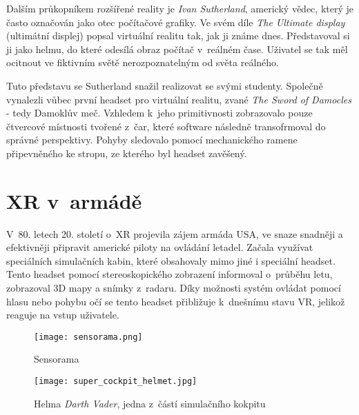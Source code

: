 Dalším průkopníkem rozšířené reality je \textit{Ivan Sutherland}, americký vědec, který je často označován jako otec počítačové grafiky. Ve svém díle \textit{The Ultimate display} (ultimátní displej) popsal virtuální realitu tak, jak ji známe dnes. Představoval si ji jako helmu, do které odesílá obraz počítač v~reálném čase. Uživatel se tak měl ocitnout ve fiktivním světě nerozpoznatelným od světa reálného. \cite{otechnice} \cite{ivan_sutherland_bio}

Tuto představu se Sutherland snažil realizovat se svými studenty. Společně vynalezli vůbec první headset pro virtuální realitu, zvané \textit{The Sword of Damocles} - tedy Damoklův meč. Vzhledem k~jeho primitivnosti zobrazovalo pouze čtvercové místnosti tvořené z~čar, které software následně transofrmoval do správné perspektivy. Pohyby sledovalo pomocí mechanického ramene připevněného ke stropu, ze kterého byl headset zavěšený. \cite{otechnice} \cite{Rheingold_1992}

\section{XR v~armádě}

V~80. letech 20. století o~XR projevila zájem armáda USA, ve snaze snadněji a efektivněji připravit americké piloty na ovládání letadel. Začala využívat speciálních simulačních kabin, které obsahovaly mimo jiné i speciální headset. Tento headset pomocí stereoskopického zobrazení informoval o~průběhu letu, zobrazoval 3D mapy a snímky z~radaru. Díky možnosti systém ovládat pomocí hlasu nebo pohybu očí se tento headset přibližuje k~dnešnímu stavu VR, jelikož reaguje na vstup uživatele. \cite{otechnice}


\begin{figure}[H]
    \centering

    \begin{minipage}{.5\textwidth}
        \centering
        \texttt{[image: sensorama.png]}
        \caption{Sensorama \cite{sensorama_patent}}
        \label{sensorama_fig}
    \end{minipage}%
    \begin{minipage}{.5\textwidth}
        \centering
        \texttt{[image: super\_cockpit\_helmet.jpg]}
        \caption{Helma \textit{Darth Vader}, jedna z~částí simulačního kokpitu \cite{super_cockpit_image}}
        \label{sensorama}
    \end{minipage}

\end{figure}

